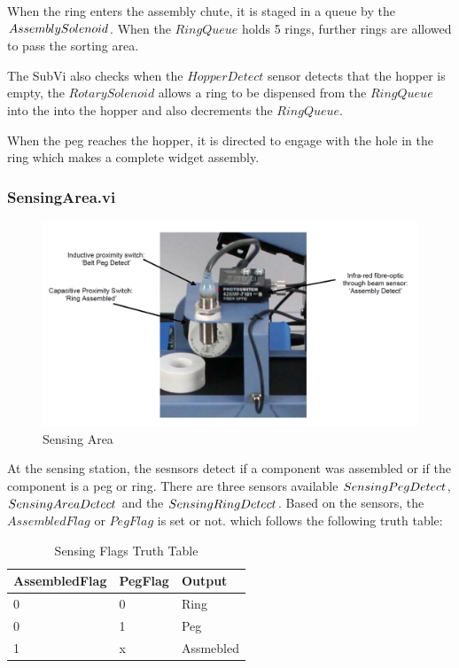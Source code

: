 \documentclass[12pt]{article}
\begin{document}
    When the ring enters the assembly chute, it is staged in a queue by the $Assembly\-Solenoid$.
    When the $RingQueue$ holds 5 rings, further rings are allowed to pass the sorting area.

    The SubVi also checks when the $HopperDetect$ sensor 
    detects that the hopper is empty, the 
    $RotarySolenoid$ allows a ring to be dispensed from the $RingQueue$ into the
    into the hopper and also decrements the $RingQueue$.
    
    When the peg reaches the hopper, it is directed to engage with the hole in the ring
    which makes a complete widget assembly.

  \subsubsection{SensingArea.vi}
    \begin{figure}[H]
      \centering
      \includegraphics[width=\linewidth]{images/sensing-area.png}
      \caption{Sensing Area\cite{ictmanual}}
    \end{figure}

    At the sensing station, the sesnsors detect if a com\-ponent was ass\-embled or if the
    com\-ponent is a peg or ring. There are three sensors available $Sensing\-Peg\-Detect$, 
    $Sensing\-Area\-Detect$ and the $Sensing\-Ring\-Detect$. 
    Based on the sensors, the $AssembledFlag$ or $PegFlag$ is set or not. which follows the
    following truth table:
    \begin{table}[!ht]
      \centering
      \begin{tabular}{|l|l|l|}
      \hline
      \textbf{AssembledFlag} & \textbf{PegFlag} & \textbf{Output} \\ \hline
      0                      & 0                & Ring            \\ \hline
      0                      & 1                & Peg             \\ \hline
      1                      & x                & Assmebled       \\ \hline
      \end{tabular}
      \caption{Sensing Flags Truth Table}
      \label{tab:flagout}
    \end{table}
\end{document}
